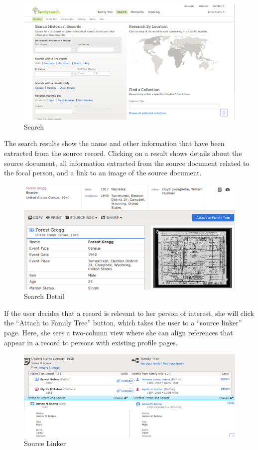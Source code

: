 \documentclass[format=siggraph, review=true]{acmart}
\begin{document}
\begin{figure}[h]
\includegraphics[width=\columnwidth]{images/familysearch/search-records.png}
\caption{Search}
\label{fig:search-record}
\end{figure}

The search results show the name and other information that have been
extracted from the source record. Clicking on a result shows details
about the source document, all information extracted from the source
document related to the focal person, and a link to an image of the
source document.

\begin{figure}[h]
\includegraphics[width=\columnwidth]{images/familysearch/search_result_detail.png}
\caption{Search Detail}
\label{fig:search-details}
\end{figure}

If the user decides that a record is relevant to her person of
interest, she will click the ``Attach to Family Tree'' button, which
takes the user to a ``source linker'' page. Here, she sees a two-column view
where she can align references that appear in a record to
persons with existing profile pages.

\begin{figure}[h]
\includegraphics[width=\columnwidth]{images/familysearch/source_linker.png}
\caption{Source Linker}
\label{fig:source-linker}
\end{figure}
\end{document}
